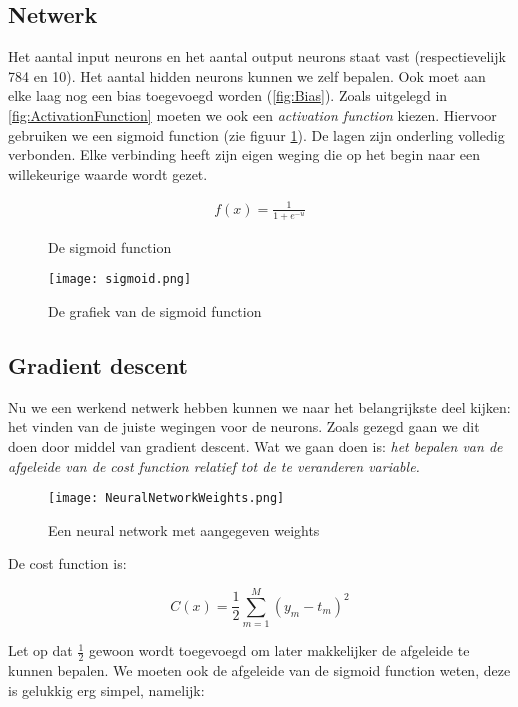 \subsection{Netwerk}
Het aantal input neurons en het aantal output neurons staat vast (respectievelijk 784 en 10). Het aantal hidden neurons kunnen we zelf bepalen. Ook moet aan elke laag nog een bias toegevoegd worden (\ref{fig:Bias}). Zoals uitgelegd in \ref{fig:ActivationFunction} moeten we ook een \textit{activation function} kiezen. Hiervoor gebruiken we een sigmoid function (zie figuur \ref{fig:sigmoid-function}). De lagen zijn onderling volledig verbonden. Elke verbinding heeft zijn eigen weging die op het begin naar een willekeurige waarde wordt gezet.

\begin{figure}[H]
	\begin{align*}
	   f(x) = \frac{1}{1 + e^{-u}}
	\end{align*}
	\caption{De sigmoid function}
\end{figure}

\begin{figure}[H]
  \centering
    \texttt{[image: sigmoid.png]}
  \caption{De grafiek van de sigmoid function}
  \label{fig:sigmoid-function}
\end{figure}


\subsection{Gradient descent}
Nu we een werkend netwerk hebben kunnen we naar het belangrijkste deel kijken: het vinden van de juiste wegingen voor de neurons. Zoals gezegd gaan we dit doen door middel van gradient descent.
Wat we gaan doen is: \textit{het bepalen van de afgeleide van de cost function relatief tot de te veranderen variable.}

\begin{figure}[H]
  \centering
    \texttt{[image: NeuralNetworkWeights.png]}
  \caption{Een neural network met aangegeven weights}
  \label{fig:NeuralNetworkWeights}
\end{figure}

De cost function is:

$$ C(x) = \frac{1}{2}\sum_{m=1}^{M}(y_{m}-t_{m})^2 $$

Let op dat $\frac{1}{2}$ gewoon wordt toegevoegd om later makkelijker de afgeleide te kunnen bepalen. We moeten ook de afgeleide van de sigmoid function weten, deze is gelukkig erg simpel, namelijk:


